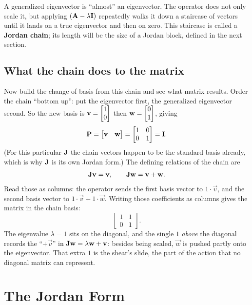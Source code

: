 \begin{intuitionbox}
A generalized eigenvector is ``almost'' an eigenvector. The operator does not only
scale it, but applying $(\mathbf{A}-\lambda\mathbf{I})$ repeatedly walks it down a
staircase of vectors until it lands on a true eigenvector and then on zero. This
staircase is called a \textbf{Jordan chain}; its length will be the size of a Jordan
block, defined in the next section.
\end{intuitionbox}

\subsection{What the chain does to the matrix}

Now build the change of basis from this chain and see what matrix results. Order the chain
``bottom up'': put the eigenvector first, the generalized eigenvector second. So the new
basis is $\mathbf{v}=\begin{bmatrix}1\\0\end{bmatrix}$ then $\mathbf{w}=\begin{bmatrix}0\\1\end{bmatrix}$, giving
\[
\mathbf{P}=\begin{bmatrix}\mathbf{v}&\mathbf{w}\end{bmatrix}=\begin{bmatrix}1&0\\0&1\end{bmatrix}=\mathbf{I}.
\]
(For this particular $\mathbf{J}$ the chain vectors happen to be the standard basis already,
which is why $\mathbf{J}$ is its own Jordan form.) The defining relations of the chain are
\[
\mathbf{J}\mathbf{v}=\mathbf{v},\qquad \mathbf{J}\mathbf{w}=\mathbf{v}+\mathbf{w}.
\]
Read those as columns: the operator sends the first basis vector to $1\cdot\vec{v}$, and
the second basis vector to $1\cdot\vec{v}+1\cdot\vec{w}$. Writing those coefficients as
columns gives the matrix in the chain basis:
\[
\begin{bmatrix}1&1\\0&1\end{bmatrix}.
\]
The eigenvalue $\lambda=1$ sits on the diagonal, and the single $1$ \emph{above} the
diagonal records the ``$+\vec{v}$'' in $\mathbf{J}\mathbf{w}=\lambda\mathbf{w}+\mathbf{v}$: besides
being scaled, $\vec{w}$ is pushed partly onto the eigenvector. That extra $1$ is the
shear's slide, the part of the action that no diagonal matrix can represent.

\section{The Jordan Form}
\label{ch28:jordan}

